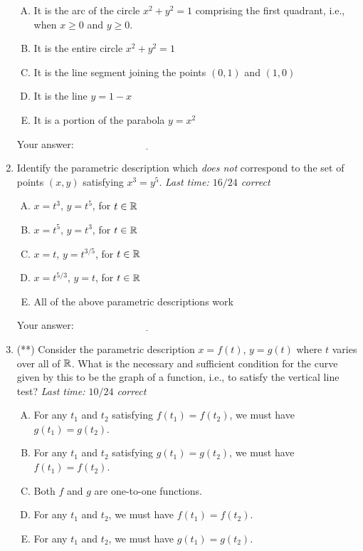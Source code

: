 \documentclass[10pt]{amsart}
\begin{document}
\begin{enumerate}
  \begin{enumerate}[(A)]
  \item It is the arc of the circle $x^2 + y^2 = 1$ comprising the
    first quadrant, i.e., when $x \ge 0$ and $y \ge 0$.
  \item It is the entire circle $x^2 + y^2 = 1$
  \item It is the line segment joining the points $(0,1)$ and $(1,0)$
  \item It is the line $y = 1 - x$
  \item It is a portion of the parabola $y = x^2$
  \end{enumerate}

  \vspace{0.1in}
  Your answer: $\underline{\qquad\qquad\qquad\qquad\qquad\qquad\qquad}$
  \vspace{0.6in}

\item Identify the parametric description which {\em does not}
  correspond to the set of points $(x,y)$ satisfying $x^3 = y^5$. {\em
    Last time: $16/24$ correct}

  \begin{enumerate}[(A)]
  \item $x = t^3$, $y = t^5$, for $t \in \mathbb{R}$
  \item $x = t^5$, $y = t^3$, for $t \in \mathbb{R}$
  \item $x = t$, $y = t^{3/5}$, for $t \in \mathbb{R}$
  \item $x = t^{5/3}$, $y = t$, for $t \in \mathbb{R}$
  \item All of the above parametric descriptions work
  \end{enumerate}

  \vspace{0.1in}
  Your answer: $\underline{\qquad\qquad\qquad\qquad\qquad\qquad\qquad}$
  \vspace{0.6in}

\item (**) Consider the parametric description $x = f(t)$, $y = g(t)$
  where $t$ varies over all of $\mathbb{R}$. What is the necessary and
  sufficient condition for the curve given by this to be the graph of
  a function, i.e., to satisfy the vertical line test? {\em Last time:
    $10/24$ correct}

  \begin{enumerate}[(A)]
  \item For any $t_1$ and $t_2$ satisfying $f(t_1) = f(t_2)$, we must
    have $g(t_1) = g(t_2)$.
  \item For any $t_1$ and $t_2$ satisfying $g(t_1) = g(t_2)$, we must
    have $f(t_1) = f(t_2)$.
  \item Both $f$ and $g$ are one-to-one functions.
  \item For any $t_1$ and $t_2$, we must have $f(t_1) = f(t_2)$.
  \item For any $t_1$ and $t_2$, we must have $g(t_1) = g(t_2)$.
  \end{enumerate}


\end{enumerate}
\end{document}
